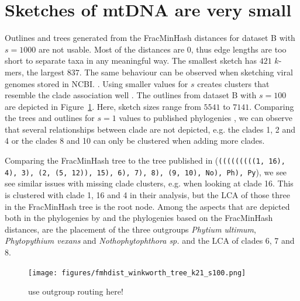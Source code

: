 \section{Sketches of mtDNA are very small}
Outlines and trees generated from the FracMinHash distances for dataset B with
$s=1000$ are not usable. Most of the distances are 0, thus edge lengths are too
short to separate taxa in any meaningful way. The smallest sketch has $421$
$k$-mers, the largest $837$. The same behaviour can be observed when sketching
viral genomes stored in NCBI. . Using smaller values for $s$ creates clusters that resemble the
clade association well
\cite{abadPhytophthoraTaxonomicPhylogenetic2023a,yangExpandedPhylogenyGenus2017}.
The outlines from dataset B with $s=100$ are depicted in
Figure~\ref{fig:winkworthOutline}. Here, sketch sizes range from $5541$ to
$7141$. Comparing the trees and outlines for $s=1$ values to published
phylogenies
\cite{abadPhytophthoraTaxonomicPhylogenetic2023a,yangExpandedPhylogenyGenus2017},
we can observe that several relationships between clade are not depicted, e.g.
the clades 1, 2 and 4 or the clades 8 and 10 can only be clustered when adding
more clades.

Comparing the FracMinHash tree to the tree published in
\cite{winkworthComparativeAnalysesComplete2022} (\texttt{(((((((((1, 16), 4),
3), (2, (5, 12)), 15), 6), 7), 8), (9, 10), No), Ph), Py}), we see see similar
issues with missing clade clusters, e.g. when looking at clade 16. This is
clustered with clade 1, 16 and 4 in their analysis, but the LCA of those three
in the FracMinHash tree is the root node. Among the aspects that are depicted
both in the phylogenies by \cite{winkworthComparativeAnalysesComplete2022} and
the phylogenies based on the FracMinHash distances, are the placement of the
three outgroups \textit{Phytium ultimum}, \textit{Phytopythium vexans} and
\textit{Nothophytophthora sp.} and the LCA of clades 6, 7 and 8.



\begin{figure}
  \centering
  \texttt{[image: figures/fmhdist\_winkworth\_tree\_k21\_s100.png]}
  \caption{use outgroup routing here!}
  \label{fig:winkworthOutline}
\end{figure}

